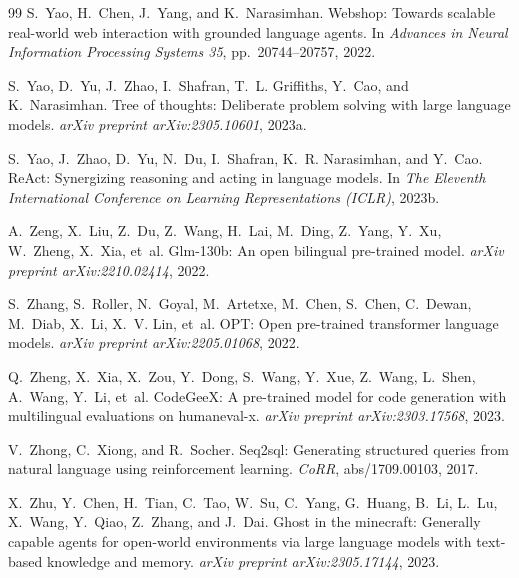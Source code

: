\begin{thebibliography}{99}
S.~Yao, H.~Chen, J.~Yang, and K.~Narasimhan.
\newblock Webshop: Towards scalable real-world web interaction with
grounded language agents.
\newblock In \emph{Advances in Neural Information Processing Systems 35},
pp.\ 20744--20757, 2022.

S.~Yao, D.~Yu, J.~Zhao, I.~Shafran, T.~L. Griffiths, Y.~Cao, and
K.~Narasimhan.
\newblock Tree of thoughts: Deliberate problem solving with large language
models.
\newblock \emph{arXiv preprint arXiv:2305.10601}, 2023a.

S.~Yao, J.~Zhao, D.~Yu, N.~Du, I.~Shafran, K.~R. Narasimhan, and Y.~Cao.
\newblock ReAct: Synergizing reasoning and acting in language models.
\newblock In \emph{The Eleventh International Conference on Learning
Representations (ICLR)}, 2023b.

A.~Zeng, X.~Liu, Z.~Du, Z.~Wang, H.~Lai, M.~Ding, Z.~Yang, Y.~Xu,
W.~Zheng, X.~Xia, et~al.
\newblock Glm-130b: An open bilingual pre-trained model.
\newblock \emph{arXiv preprint arXiv:2210.02414}, 2022.

S.~Zhang, S.~Roller, N.~Goyal, M.~Artetxe, M.~Chen, S.~Chen,
C.~Dewan, M.~Diab, X.~Li, X.~V. Lin, et~al.
\newblock OPT: Open pre-trained transformer language models.
\newblock \emph{arXiv preprint arXiv:2205.01068}, 2022.

Q.~Zheng, X.~Xia, X.~Zou, Y.~Dong, S.~Wang, Y.~Xue, Z.~Wang, L.~Shen,
A.~Wang, Y.~Li, et~al.
\newblock CodeGeeX: A pre-trained model for code generation with
multilingual evaluations on humaneval-x.
\newblock \emph{arXiv preprint arXiv:2303.17568}, 2023.

V.~Zhong, C.~Xiong, and R.~Socher.
\newblock Seq2sql: Generating structured queries from natural language
using reinforcement learning.
\newblock \emph{CoRR}, abs/1709.00103, 2017.

X.~Zhu, Y.~Chen, H.~Tian, C.~Tao, W.~Su, C.~Yang, G.~Huang, B.~Li,
L.~Lu, X.~Wang, Y.~Qiao, Z.~Zhang, and J.~Dai.
\newblock Ghost in the minecraft: Generally capable agents for open-world
environments via large language models with text-based knowledge and
memory.
\newblock \emph{arXiv preprint arXiv:2305.17144}, 2023.

\end{thebibliography}
